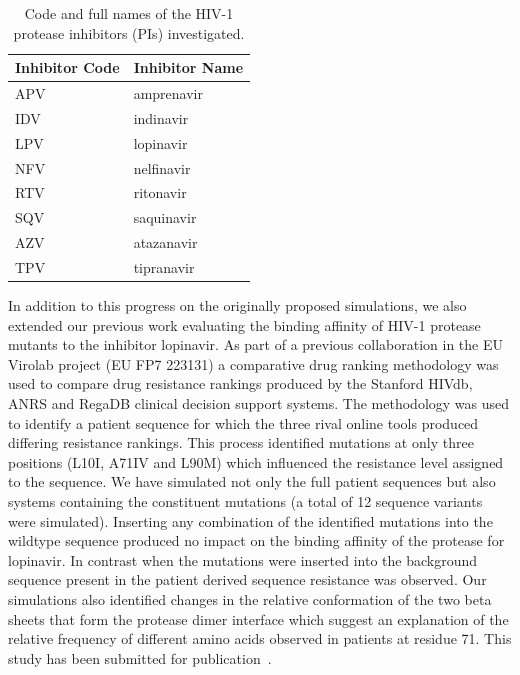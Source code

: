 \documentclass[a4paper,10pt]{article}
\begin{document}
\begin{table}
\begin{center}
\begin{tabular}{l l}
\textbf{Inhibitor Code} & \textbf{Inhibitor Name}\\
\hline
APV & amprenavir\\
IDV & indinavir\\
LPV & lopinavir\\
NFV & nelfinavir\\
RTV & ritonavir\\
SQV & saquinavir\\
AZV & atazanavir \\
TPV & tipranavir \\
\hline
\end{tabular}
\end{center}
\caption{Code and full names of the HIV-1 protease inhibitors (PIs) investigated.}
\label{tab:inhibitors}
\end{table}

In addition to this progress on the originally proposed simulations, we also extended our previous work 
evaluating the binding affinity of HIV-1 protease mutants to the inhibitor lopinavir. As part of 
a previous collaboration in the EU Virolab project (EU FP7 223131) a comparative drug ranking 
methodology was used to compare drug resistance rankings produced by the Stanford HIVdb, ANRS 
and RegaDB clinical decision support systems. The methodology was used to identify a patient 
sequence for which the three rival online tools produced differing resistance rankings. This process 
identified mutations at only three positions (L10I, A71IV and L90M) which influenced the resistance 
level assigned to the sequence. We have simulated not only the full patient sequences but also 
systems containing the constituent mutations (a total of 12 sequence variants were simulated). 
Inserting any combination of the identified mutations into the wildtype sequence produced no impact 
on the binding affinity of the protease for lopinavir. In contrast when the mutations were inserted 
into the background sequence present in the patient derived sequence resistance was observed. Our 
simulations also identified changes in the relative conformation of the two beta sheets that form 
the protease dimer interface which suggest an explanation of the relative frequency of different 
amino acids observed in patients at residue 71. This study has been submitted for publication~\cite{Owain2011}.
\end{document}
